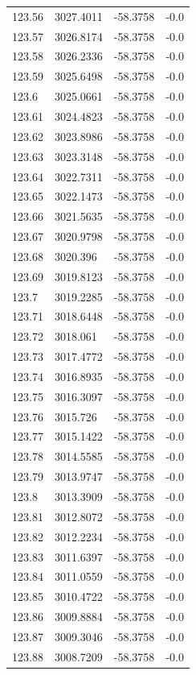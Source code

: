 \begin{table}[H]
\begin{tabular}{llll}
123.56 & 3027.4011 & -58.3758 & -0.0 \\
123.57 & 3026.8174 & -58.3758 & -0.0 \\
123.58 & 3026.2336 & -58.3758 & -0.0 \\
123.59 & 3025.6498 & -58.3758 & -0.0 \\
123.6 & 3025.0661 & -58.3758 & -0.0 \\
123.61 & 3024.4823 & -58.3758 & -0.0 \\
123.62 & 3023.8986 & -58.3758 & -0.0 \\
123.63 & 3023.3148 & -58.3758 & -0.0 \\
123.64 & 3022.7311 & -58.3758 & -0.0 \\
123.65 & 3022.1473 & -58.3758 & -0.0 \\
123.66 & 3021.5635 & -58.3758 & -0.0 \\
123.67 & 3020.9798 & -58.3758 & -0.0 \\
123.68 & 3020.396 & -58.3758 & -0.0 \\
123.69 & 3019.8123 & -58.3758 & -0.0 \\
123.7 & 3019.2285 & -58.3758 & -0.0 \\
123.71 & 3018.6448 & -58.3758 & -0.0 \\
123.72 & 3018.061 & -58.3758 & -0.0 \\
123.73 & 3017.4772 & -58.3758 & -0.0 \\
123.74 & 3016.8935 & -58.3758 & -0.0 \\
123.75 & 3016.3097 & -58.3758 & -0.0 \\
123.76 & 3015.726 & -58.3758 & -0.0 \\
123.77 & 3015.1422 & -58.3758 & -0.0 \\
123.78 & 3014.5585 & -58.3758 & -0.0 \\
123.79 & 3013.9747 & -58.3758 & -0.0 \\
123.8 & 3013.3909 & -58.3758 & -0.0 \\
123.81 & 3012.8072 & -58.3758 & -0.0 \\
123.82 & 3012.2234 & -58.3758 & -0.0 \\
123.83 & 3011.6397 & -58.3758 & -0.0 \\
123.84 & 3011.0559 & -58.3758 & -0.0 \\
123.85 & 3010.4722 & -58.3758 & -0.0 \\
123.86 & 3009.8884 & -58.3758 & -0.0 \\
123.87 & 3009.3046 & -58.3758 & -0.0 \\
123.88 & 3008.7209 & -58.3758 & -0.0 \\

\end{tabular}
\end{table}
